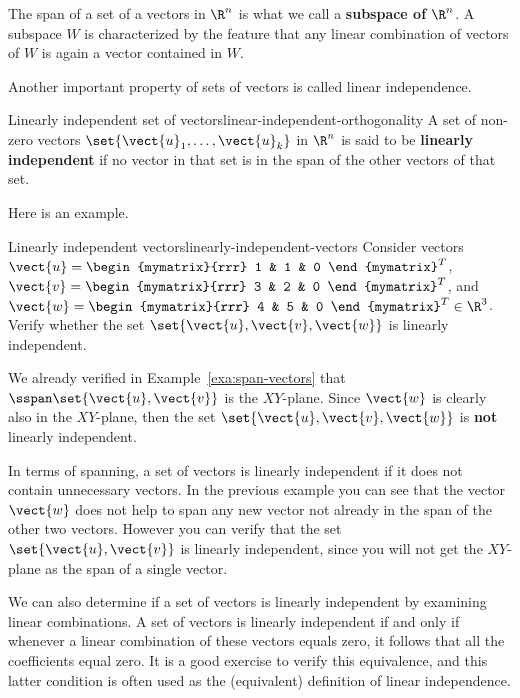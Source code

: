The span of a set of a vectors in $\R^n$ is what we call a \textbf{subspace of $\R^n$}. A subspace $W$ is characterized by the feature that any linear combination of vectors of $W$ is again a vector contained in $W$.

Another important property of sets of vectors is called linear independence.

\begin{definition}{Linearly independent set of vectors}{linear-independent-orthogonality}
A set of non-zero vectors $\set{\vect{u}_1,\ldots,\vect{u}_k}$ in $\R^{n}$ is said to be
\textbf{linearly independent}
 if no vector in that set is in the span of the other vectors of that set.
\end{definition}

Here is an example.

\begin{example}{Linearly independent vectors}{linearly-independent-vectors}
Consider vectors $\vect{u}=\begin{mymatrix}{rrr}
1  & 1 & 0
\end{mymatrix}^T$,
$\vect{v}=\begin{mymatrix}{rrr}
3  & 2 & 0
\end{mymatrix}^T$, and
$\vect{w}=\begin{mymatrix}{rrr}
4  & 5 & 0
\end{mymatrix}^T  \in \R^{3}$.
Verify whether the set $\set{\vect{u}, \vect{v}, \vect{w}}$ is linearly independent.
\end{example}

\begin{solution}
We already verified in Example~\ref{exa:span-vectors} that
$\sspan \set{\vect{u}, \vect{v}}$ is the $XY$-plane. Since $\vect{w}$
is clearly also in the $XY$-plane, then the set $\set{\vect{u}, \vect{v},
\vect{w}}$ is \textbf{not} linearly independent.
\end{solution}

In terms of spanning, a set of vectors is linearly independent if it
does not contain unnecessary vectors. In the previous example you
can see that the vector $\vect{w}$ does not help to span any new vector
not already in the span of the other two vectors. However you can
verify that the set $\set{\vect{u}, \vect{v}}$ is linearly independent,
since you will not get the $XY$-plane as the span of a single vector.

We can also determine if a set of vectors is linearly independent by examining linear combinations. A set of vectors is linearly independent if and only if
whenever a linear combination of these vectors equals zero, it follows
that all the coefficients equal zero. It is a good exercise to verify
this equivalence, and this latter condition is often used as the
(equivalent) definition of linear independence.

